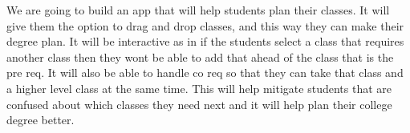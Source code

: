 We are going to build an app that will help students plan their classes. It will give them the option to drag and drop classes, and this way they can make their degree plan. It will be interactive as in if the students select a class that requires another class then they wont be able to add that ahead of the class that is the pre req. It will also be able to handle co req so that they can take that class and a higher level class at the same time. This will help mitigate students that are confused about which classes they need next and it will help plan their college degree better. 